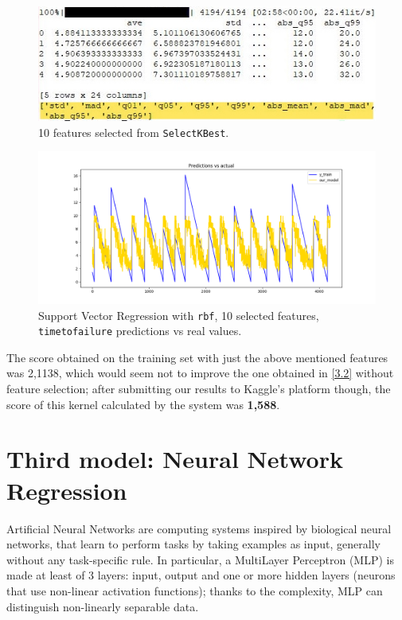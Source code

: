 \begin{figure} [h]
	\centering
	\includegraphics[width=1\linewidth]{pictures/featuresselez10_noroll.jpg}
	\caption{10 features selected from \texttt{SelectKBest}.}
	\label{fig:featsel}
\end{figure}

\begin{figure} [h]
	\centering
	\includegraphics[width=1\linewidth]{pictures/nu_svr_featuresel10.png}
	\caption{Support Vector Regression with \texttt{rbf}, 10 selected features, \texttt{time\textunderscore to\textunderscore failure} predictions vs real values.}
	\label{fig:svrsel}
\end{figure}

The score obtained on the training set with just the above mentioned features was 2,1138, which would seem not to improve the one obtained in \ref{3.2} without feature selection; after submitting our results to Kaggle's platform though, the score of this kernel calculated by the system was \textbf{1,588}.

\section[Third model]{Third model: Neural Network Regression}
Artificial Neural Networks are computing systems inspired by biological neural networks, that learn to perform tasks by taking examples as input, generally without any task-specific rule. 
In particular, a MultiLayer Perceptron (MLP) is made at least of 3 layers: input, output and one or more hidden layers (neurons that use non-linear activation functions); thanks to the complexity, MLP can distinguish non-linearly separable data.

